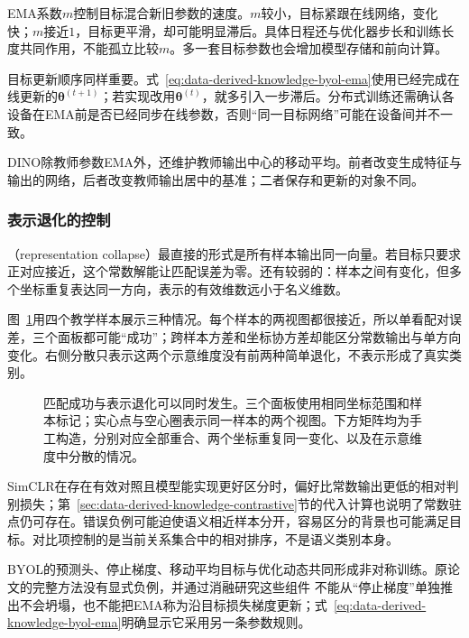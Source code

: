 EMA系数$m$控制目标混合新旧参数的速度。$m$较小，目标紧跟在线网络，变化快；$m$接近$1$，目标更平滑，却可能明显滞后。具体日程还与优化器步长和训练长度共同作用，不能孤立比较$m$。多一套目标参数也会增加模型存储和前向计算。

目标更新顺序同样重要。式~\eqref{eq:data-derived-knowledge-byol-ema}使用已经完成在线更新的$\bm{\theta}^{(t+1)}$；若实现改用$\bm{\theta}^{(t)}$，就多引入一步滞后。分布式训练还需确认各设备在EMA前是否已经同步在线参数，否则“同一目标网络”可能在设备间并不一致。

DINO除教师参数EMA外，还维护教师输出中心的移动平均。前者改变生成特征与输出的网络，后者改变教师输出居中的基准；二者保存和更新的对象不同。

\subsubsection{表示退化的控制}
\label{sec:data-derived-knowledge-representation-degeneration}

（representation collapse）最直接的形式是所有样本输出同一向量。若目标只要求正对应接近，这个常数解能让匹配误差为零。还有较弱的：样本之间有变化，但多个坐标重复表达同一方向，表示的有效维数远小于名义维数。

图~\ref{fig:data-derived-knowledge-representation-degeneration}用四个教学样本展示三种情况。每个样本的两视图都很接近，所以单看配对误差，三个面板都可能“成功”；跨样本方差和坐标协方差却能区分常数输出与单方向变化。右侧分散只表示这两个示意维度没有前两种简单退化，不表示形成了真实类别。

\begin{figure}[!t]
  \centering
  
  \caption{匹配成功与表示退化可以同时发生。三个面板使用相同坐标范围和样本标记；实心点与空心圈表示同一样本的两个视图。下方矩阵均为手工构造，分别对应全部重合、两个坐标重复同一变化、以及在示意维度中分散的情况。}
  \label{fig:data-derived-knowledge-representation-degeneration}
\end{figure}

SimCLR在存在有效对照且模型能实现更好区分时，偏好比常数输出更低的相对判别损失；第~\ref{sec:data-derived-knowledge-contrastive}节的代入计算也说明了常数驻点仍可存在。错误负例可能迫使语义相近样本分开，容易区分的背景也可能满足目标。对比项控制的是当前关系集合中的相对排序，不是语义类别本身。

BYOL的预测头、停止梯度、移动平均目标与优化动态共同形成非对称训练。原论文的完整方法没有显式负例，并通过消融研究这些组件
不能从“停止梯度”单独推出不会坍塌，也不能把EMA称为沿目标损失梯度更新；式~\eqref{eq:data-derived-knowledge-byol-ema}明确显示它采用另一条参数规则。

